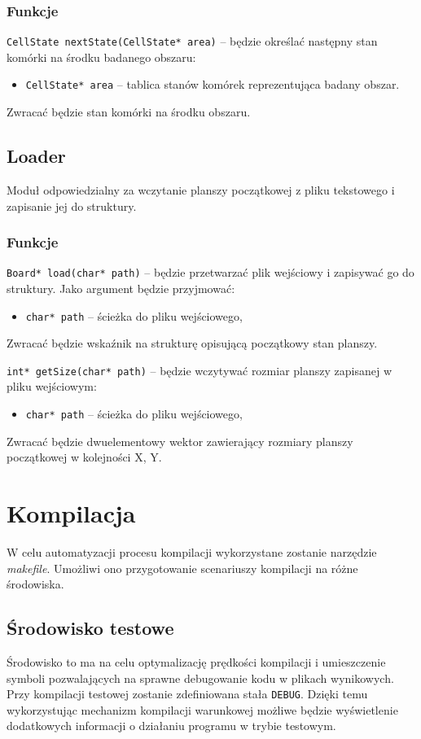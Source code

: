 \documentclass{mwart}
\begin{document}
\subsubsection{Funkcje}
\noindent{}\texttt{CellState nextState(CellState* area)} -- będzie określać następny stan komórki na środku badanego obszaru:
\begin{itemize}[label={}]
	\item \texttt{CellState* area} -- tablica stanów komórek reprezentująca badany obszar.
\end{itemize}
Zwracać będzie stan komórki na środku obszaru.


\subsection{Loader}
Moduł odpowiedzialny za wczytanie planszy początkowej z pliku tekstowego i zapisanie jej do struktury.

\subsubsection{Funkcje}
\texttt{Board* load(char* path)} -- będzie przetwarzać plik wejściowy i zapisywać go do struktury. Jako argument będzie przyjmować:
\begin{itemize}[label={}]
	\item \texttt{char* path} -- ścieżka do pliku wejściowego,
\end{itemize}
Zwracać będzie wskaźnik na strukturę opisującą początkowy stan planszy.
\vspace{5mm}

\noindent{}\texttt{int* getSize(char* path)} -- będzie wczytywać rozmiar planszy zapisanej w pliku wejściowym:
\begin{itemize}[label={}]
	\item \texttt{char* path} -- ścieżka do pliku wejściowego,
\end{itemize}
Zwracać będzie dwuelementowy wektor zawierający rozmiary planszy początkowej w kolejności X, Y.

\section{Kompilacja}
W celu automatyzacji procesu kompilacji wykorzystane zostanie narzędzie \textit{makefile}. Umożliwi ono przygotowanie scenariuszy kompilacji na różne środowiska.

\subsection{Środowisko testowe}
Środowisko to ma na celu optymalizację prędkości kompilacji i umieszczenie symboli pozwalających na sprawne debugowanie kodu w plikach wynikowych. Przy kompilacji testowej zostanie zdefiniowana stała \texttt{DEBUG}. Dzięki temu wykorzystując mechanizm kompilacji warunkowej możliwe będzie wyświetlenie dodatkowych informacji o działaniu programu w trybie testowym.
\end{document}
